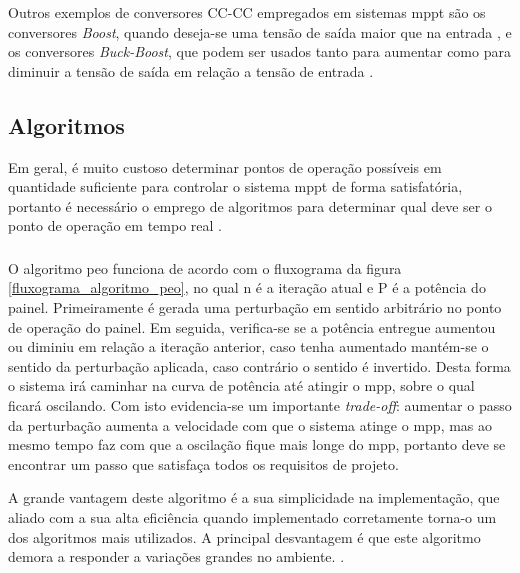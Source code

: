 Outros exemplos de conversores CC-CC empregados em sistemas \gls{mppt} são os conversores \textit{Boost}, quando deseja-se uma tensão de saída maior que na entrada \cite{xiao2007}, e os conversores \textit{Buck-Boost}, que podem ser usados tanto para aumentar como para diminuir a tensão de saída em relação a tensão de entrada \cite{qaiser2014}.

\subsection{Algoritmos}

Em geral, é muito custoso determinar pontos de operação possíveis em quantidade suficiente para controlar o sistema \gls{mppt} de forma satisfatória, portanto é necessário o emprego de algoritmos para determinar qual deve ser o ponto de operação em tempo real \cite{al2016}.

\subsubsection{}

O algoritmo \gls{peo} funciona de acordo com o fluxograma da figura \ref{fluxograma_algoritmo_peo}, no qual n é a iteração atual e P é a potência do painel. Primeiramente é gerada uma perturbação em sentido arbitrário no ponto de operação do painel. Em seguida, verifica-se se a potência entregue aumentou ou diminiu em relação a iteração anterior, caso tenha aumentado mantém-se o sentido da perturbação aplicada, caso contrário o sentido é invertido. Desta forma o sistema irá caminhar na curva de potência até atingir o \gls{mpp}, sobre o qual ficará oscilando. Com isto evidencia-se um importante \textit{trade-off}: aumentar o passo da perturbação aumenta a velocidade com que o sistema atinge o \gls{mpp}, mas ao mesmo tempo faz com que a oscilação fique mais longe do \gls{mpp}, portanto deve se encontrar um passo que satisfaça todos os requisitos de projeto.

A grande vantagem deste algoritmo é a sua simplicidade na implementação, que aliado com a sua alta eficiência quando implementado corretamente torna-o um dos algoritmos mais utilizados. A principal desvantagem é que este algoritmo demora a responder a variações grandes no ambiente. \cite{ngan2011}.

